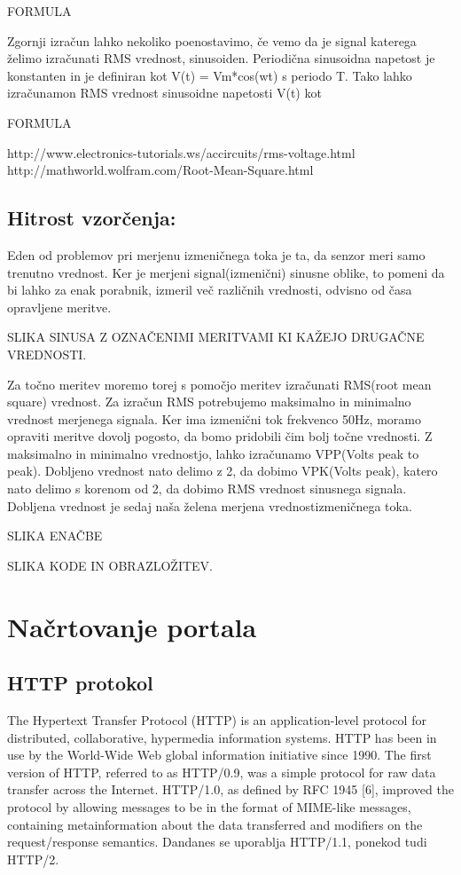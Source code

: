 \documentclass[12pt,a4paper,titlepage,openany]{report}
\begin{document}
FORMULA

Zgornji izračun lahko nekoliko poenostavimo, če vemo da je signal katerega želimo izračunati RMS vrednost, sinusoiden.
Periodična sinusoidna napetost je konstanten in je definiran kot V(t) = Vm*cos(wt) s periodo T. Tako lahko izračunamon RMS
vrednost sinusoidne napetosti V(t) kot

FORMULA

http://www.electronics-tutorials.ws/accircuits/rms-voltage.html
http://mathworld.wolfram.com/Root-Mean-Square.html


\subsection{Hitrost vzorčenja:}
Eden od problemov pri merjenu izmeničnega toka je ta, da senzor meri samo trenutno vrednost. Ker je merjeni signal(izmenični) sinusne oblike, to pomeni da bi lahko za enak porabnik, izmeril več različnih vrednosti, odvisno od časa opravljene meritve.

SLIKA SINUSA Z OZNAČENIMI MERITVAMI KI KAŽEJO DRUGAČNE VREDNOSTI.

Za točno meritev moremo torej s pomočjo meritev izračunati RMS(root mean square) vrednost. Za izračun RMS potrebujemo maksimalno in minimalno vrednost merjenega signala. Ker ima izmenični tok frekvenco 50Hz, moramo opraviti meritve dovolj pogosto, da bomo pridobili čim bolj točne vrednosti. Z maksimalno in minimalno vrednostjo, lahko izračunamo VPP(Volts peak to peak). Dobljeno vrednost nato delimo z 2, da dobimo VPK(Volts peak), katero nato delimo s korenom od 2, da dobimo RMS vrednost sinusnega signala. Dobljena vrednost je sedaj naša želena merjena vrednostizmeničnega toka.

SLIKA ENAČBE

SLIKA KODE IN OBRAZLOŽITEV.


\section{Načrtovanje portala}
\thispagestyle{fancy}


\subsection{HTTP protokol}
The Hypertext Transfer Protocol (HTTP) is an application-level
   protocol for distributed, collaborative, hypermedia information
   systems. HTTP has been in use by the World-Wide Web global
   information initiative since 1990. The first version of HTTP,
   referred to as HTTP/0.9, was a simple protocol for raw data transfer
   across the Internet. HTTP/1.0, as defined by RFC 1945 [6], improved
   the protocol by allowing messages to be in the format of MIME-like
   messages, containing metainformation about the data transferred and
   modifiers on the request/response semantics. Dandanes se uporablja
   HTTP/1.1, ponekod tudi HTTP/2. 
\end{document}
